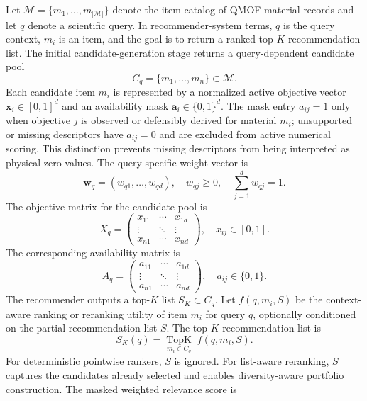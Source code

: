 \documentclass[12pt,a4paper]{article}
\begin{document}
Let $\mathcal{M} = \{m_1, \ldots, m_{|\mathcal{M}|}\}$ denote the item catalog of QMOF material records and let $q$ denote a scientific query. In recommender-system terms, $q$ is the query context, $m_i$ is an item, and the goal is to return a ranked top-$K$ recommendation list. The initial candidate-generation stage returns a query-dependent candidate pool
\begin{equation}
  C_q = \{m_1, \ldots, m_n\} \subset \mathcal{M}.
  \label{eq:cq}
\end{equation}
Each candidate item $m_i$ is represented by a normalized active objective vector $\mathbf{x}_i \in [0,1]^d$ and an availability mask $\mathbf{a}_i \in \{0,1\}^d$. The mask entry $a_{ij}=1$ only when objective $j$ is observed or defensibly derived for material $m_i$; unsupported or missing descriptors have $a_{ij}=0$ and are excluded from active numerical scoring. This distinction prevents missing descriptors from being interpreted as physical zero values.
The query-specific weight vector is
\begin{equation}
  \mathbf{w}_q = (w_{q1}, \ldots, w_{qd}),\quad w_{qj} \geq 0,\quad \sum_{j=1}^{d} w_{qj} = 1.
\end{equation}
The objective matrix for the candidate pool is
\begin{equation}
  X_q = \begin{pmatrix} x_{11} & \cdots & x_{1d} \\ \vdots & \ddots & \vdots \\ x_{n1} & \cdots & x_{nd} \end{pmatrix},\quad x_{ij}\in[0,1].
\end{equation}
The corresponding availability matrix is
\begin{equation}
  A_q = \begin{pmatrix} a_{11} & \cdots & a_{1d} \\ \vdots & \ddots & \vdots \\ a_{n1} & \cdots & a_{nd} \end{pmatrix},\quad a_{ij}\in\{0,1\}.
\end{equation}
The recommender outputs a top-$K$ list $S_K \subset C_q$. Let $f(q, m_i, S)$ be the context-aware ranking or reranking utility of item $m_i$ for query $q$, optionally conditioned on the partial recommendation list $S$. The top-$K$ recommendation list is
\begin{equation}
  S_K(q) = \underset{m_i \in C_q}{\operatorname{TopK}}\; f(q, m_i, S).
\end{equation}
For deterministic pointwise rankers, $S$ is ignored. For list-aware reranking, $S$ captures the candidates already selected and enables diversity-aware portfolio construction. The masked weighted relevance score is
\end{document}
